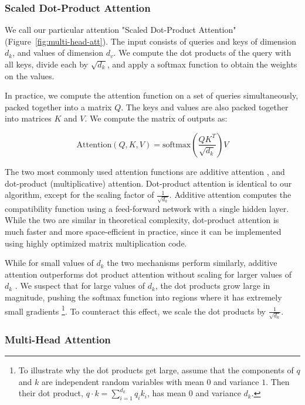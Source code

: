 \documentclass{article}
\begin{document}
\subsubsection{Scaled Dot-Product Attention} \label{sec:scaled-dot-prod}

We call our particular attention "Scaled Dot-Product Attention" (Figure~\ref{fig:multi-head-att}).   The input consists of queries and keys of dimension $d_k$, and values of dimension $d_v$.  We compute the dot products of the query with all keys, divide each by $\sqrt{d_k}$, and apply a softmax function to obtain the weights on the values.

In practice, we compute the attention function on a set of queries simultaneously, packed together into a matrix $Q$.   The keys and values are also packed together into matrices $K$ and $V$.  We compute the matrix of outputs as:

\begin{equation}
   \mathrm{Attention}(Q, K, V) = \mathrm{softmax}(\frac{QK^T}{\sqrt{d_k}})V
\end{equation}

The two most commonly used attention functions are additive attention \citep{bahdanau2014neural}, and dot-product (multiplicative) attention.  Dot-product attention is identical to our algorithm, except for the scaling factor of $\frac{1}{\sqrt{d_k}}$. Additive attention computes the compatibility function using a feed-forward network with a single hidden layer.  While the two are similar in theoretical complexity, dot-product attention is much faster and more space-efficient in practice, since it can be implemented using highly optimized matrix multiplication code. 

While for small values of $d_k$ the two mechanisms perform similarly, additive attention outperforms dot product attention without scaling for larger values of $d_k$ \citep{DBLP:journals/corr/BritzGLL17}. We suspect that for large values of $d_k$, the dot products grow large in magnitude, pushing the softmax function into regions where it has extremely small gradients  \footnote{To illustrate why the dot products get large, assume that the components of $q$ and $k$ are independent random variables with mean $0$ and variance $1$.  Then their dot product, $q \cdot k = \sum_{i=1}^{d_k} q_ik_i$, has mean $0$ and variance $d_k$.}. To counteract this effect, we scale the dot products by $\frac{1}{\sqrt{d_k}}$.

\subsubsection{Multi-Head Attention} \label{sec:multihead}
\end{document}
